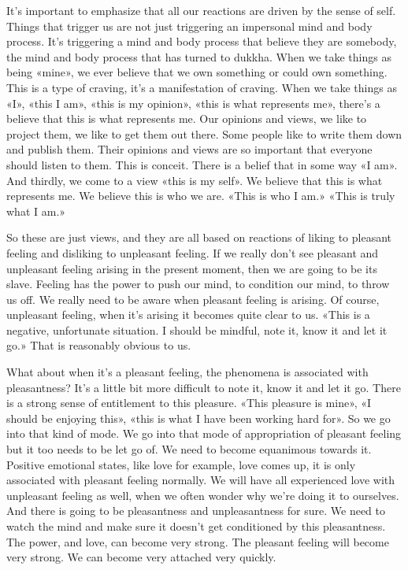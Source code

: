 \documentclass[letterpaper,10pt,english]{sphinxmanual}
\begin{document}
\sphinxAtStartPar
It’s important to emphasize that all our reactions are driven by the sense
of self. Things that trigger us are not just triggering an impersonal mind and
body process. It’s triggering a mind and body process that believe they are
somebody, the mind and body process that has turned to dukkha. When we
take  things  as  being  «mine»,  we  ever  believe  that  we  own  something  or
could own something. This is a type of craving, it’s a manifestation of craving. When we take things as «I», «this I am», «this is my opinion», «this is
what represents me», there’s a believe that this is what represents me. Our
opinions and views, we like to project them, we like to get them out there.
Some people like to write them down and publish them. Their opinions and
views are so important that everyone should listen to them. This is conceit.
There is a belief that in some way «I am». And thirdly, we come to a view
«this is my self». We believe that this is what represents me. We believe this
is who we are. «This is who I am.» «This is truly what I am.»

\sphinxAtStartPar
So these are just views, and they are all based on reactions of liking
to pleasant feeling and disliking to unpleasant feeling. If we really don’t see
pleasant and unpleasant feeling arising in the present moment, then we are
going to be its slave. Feeling has the power to push our mind, to condition
our mind, to throw us off. We really need to be aware when pleasant feeling
  is arising. Of course, unpleasant feeling, when it’s arising it becomes quite
clear to us. «This is a negative, unfortunate situation. I should be mindful,
note it, know it and let it go.» That is reasonably obvious to us.

\sphinxAtStartPar
What about when it’s a pleasant feeling, the phenomena is associated
with pleasantness? It’s a little bit more difficult to note it, know it and let it
go. There is a strong sense of entitlement to this pleasure. «This pleasure is
mine», «I should be enjoying this», «this is what I have been working hard
for». So we go into that kind of mode. We go into that mode of appropriation of pleasant feeling but it too needs to be let go of. We need to become
equanimous towards it. Positive emotional states, like love for example, love
comes up, it is only associated with pleasant feeling normally. We will have
all experienced love with unpleasant feeling as well, when we often wonder
why we’re doing it to ourselves. And there is going to be pleasantness and
unpleasantness for sure. We need to watch the mind and make sure it doesn’t
get conditioned by this pleasantness. The power, and love, can become very
strong. The pleasant feeling will become very strong. We can become very
attached very quickly.
\end{document}

